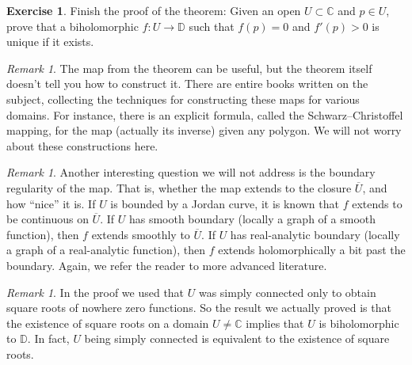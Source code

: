 \documentclass[12pt,openany]{book}
\newcommand{\widebar}[1]{\overline{#1}}
\newcommand{\C}{{\mathbb{C}}}
\newcommand{\D}{{\mathbb{D}}}
\newcommand{\myquote}[1]{``#1''}
\theoremstyle{plain}
\theoremstyle{remark}
\newtheorem{remark}[thm]{Remark}
\theoremstyle{definition}
\newenvironment{exbox}{%
    \def\FrameCommand{\vrule width 1pt \relax\hspace{10pt}}%
    \MakeFramed{\advance\hsize-\width\FrameRestore}%
}{%
    \endMakeFramed
}
\theoremstyle{exercise}
\newtheorem{exercise}{Exercise}[section]
\theoremstyle{example}
\begin{document}
\begin{exbox}
\begin{exercise}
Finish the proof of the theorem:
Given an open $U \subset \C$ and $p \in U$, prove
that a biholomorphic 
$f \colon U \to \D$ such that $f(p) = 0$ and $f'(p) > 0$ is unique if it exists.
\end{exercise}
\end{exbox}

\begin{remark}
The map from the theorem can be useful, but the theorem
itself doesn't tell you how to construct it.
There are entire books
written on the subject, collecting the techniques for constructing
these maps for various domains.
For instance, there is an explicit formula, called the Schwarz--Christoffel
mapping, for the map (actually its inverse) given any polygon.
We will not worry about these constructions here.
\end{remark}


\begin{remark}
Another interesting question we will not address
is the boundary regularity of the map.  That is, whether the map extends to
the closure $\widebar{U}$, and how \myquote{nice} it is.  If $U$ is
bounded by a Jordan curve, it is known that $f$ extends to be continuous on
$\widebar{U}$.  If $U$ has smooth boundary (locally a graph of a smooth
function), then $f$ extends smoothly to $\widebar{U}$.
If $U$ has real-analytic boundary (locally a graph of a real-analytic
function), then $f$ extends holomorphically a bit past the boundary.
Again, we refer the reader to more advanced literature.
\end{remark}

\begin{remark}
In the proof we used that $U$ was simply connected only to 
obtain square roots of nowhere zero functions.  So the result we actually
proved is that the existence of square roots on a domain $U \neq \C$ implies that $U$ is
biholomorphic to $\D$.  In fact, $U$ being simply
connected is equivalent to the existence of square roots.
\end{remark}
\end{document}
